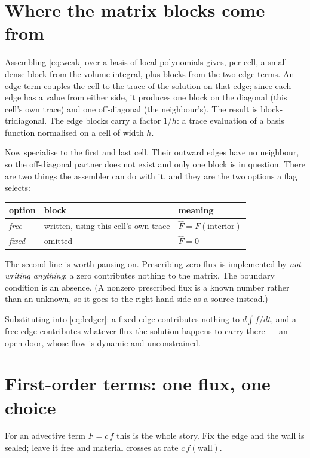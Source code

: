 \documentclass[11pt]{article}
\begin{document}
\section{Where the matrix blocks come from}

Assembling \eqref{eq:weak} over a basis of local polynomials gives, per cell, a
small dense block from the volume integral, plus blocks from the two edge terms.
An edge term couples the cell to the trace of the solution on that edge; since
each edge has a value from either side, it produces one block on the diagonal
(this cell's own trace) and one off-diagonal (the neighbour's). The result is
block-tridiagonal. The edge blocks carry a factor $1/h$: a trace evaluation of
a basis function normalised on a cell of width $h$.

Now specialise to the first and last cell. Their outward edges have no
neighbour, so the off-diagonal partner does not exist and only one block is in
question. There are two things the assembler can do with it, and they are the
two options a flag selects:

\begin{center}
\begin{tabular}{@{}lll@{}}
\toprule
option & block & meaning \\
\midrule
\emph{free} & written, using this cell's own trace &
  $\widehat F = F(\text{interior})$ \\
\emph{fixed} & omitted &
  $\widehat F = 0$ \\
\bottomrule
\end{tabular}
\end{center}

The second line is worth pausing on. Prescribing zero flux is implemented by
\emph{not writing anything}: a zero contributes nothing to the matrix. The
boundary condition is an absence. (A nonzero prescribed flux is a known number
rather than an unknown, so it goes to the right-hand side as a source instead.)

Substituting into \eqref{eq:ledger}: a fixed edge contributes nothing to
$d\!\int\! f/dt$, and a free edge contributes whatever flux the solution happens
to carry there --- an open door, whose flow is dynamic and unconstrained.

\section{First-order terms: one flux, one choice}

For an advective term $F = c\,f$ this is the whole story. Fix the edge and the
wall is sealed; leave it free and material crosses at rate $c\,f(\text{wall})$.
\end{document}

